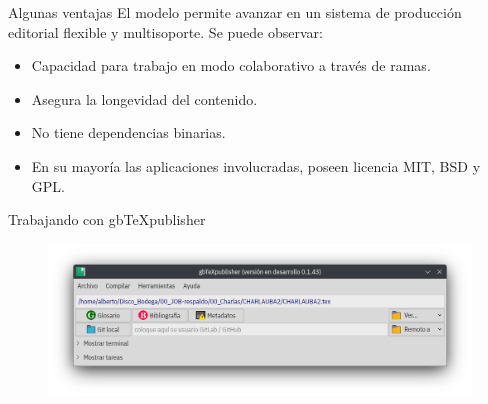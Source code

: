 \documentclass[14pt,aspectratio=169]{beamer}
\begin{document}

\begin{frame}{Algunas ventajas}
El modelo permite avanzar en un sistema de producción editorial flexible y multisoporte. Se puede observar:

\begin{itemize}
	\item<2-> Capacidad para trabajo en modo colaborativo a través de ramas.
	\item<3-> Asegura la longevidad del contenido.
	\item<4-> No tiene dependencias binarias.
	\item<5-> En su mayoría las aplicaciones involucradas, poseen licencia MIT, BSD y GPL.
\end{itemize}
\end{frame}

\begin{frame}{Trabajando con gbTeXpublisher}
	\begin{figure}
		\centering
		\includegraphics[width=.8\textwidth]{captura.png}
	\end{figure}
\end{frame}

\end{document}
